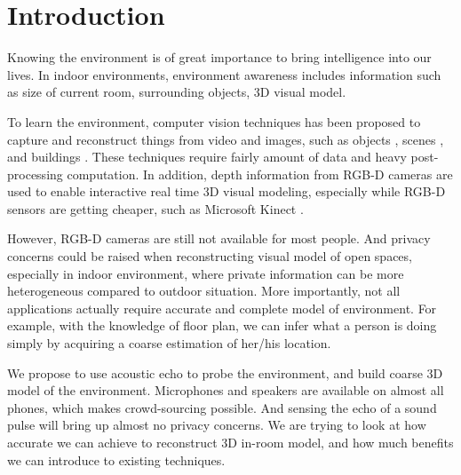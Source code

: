 \section{Introduction}
\label{sec:intro}

Knowing the environment is of great importance to bring intelligence into our lives. 
In indoor environments, environment awareness includes information such as size of 
current room, surrounding objects, 3D visual model. 


To learn the environment, computer vision techniques has been proposed to capture 
and reconstruct things from video and images, such as objects 
\cite{rothganger20063d}, scenes \cite{snavely2006photo}, and buildings 
\cite{furukawa2009reconstructing}. These techniques require fairly amount of 
data and heavy post-processing computation. In addition, depth information from 
RGB-D cameras are used to enable interactive real time 3D visual modeling, 
especially while RGB-D sensors are getting cheaper, such as Microsoft Kinect 
\cite{du2011interactive, izadi2011kinectfusion}.


However, RGB-D cameras are still not available for most people. And privacy 
concerns could be raised when reconstructing visual model of open spaces, 
especially in indoor environment, where private information can be more 
heterogeneous compared to outdoor situation. More importantly, not all 
applications actually require accurate and complete model of environment. 
For example, with the knowledge of floor plan, we can infer what a person 
is doing simply by acquiring a coarse estimation of her/his location. 


We propose to use acoustic echo to probe the environment, and build coarse 3D model 
of the environment. Microphones and speakers are available on almost all phones, 
which makes crowd-sourcing possible. And 
sensing the echo of a sound pulse will bring up almost no privacy concerns. We are 
trying to look at how accurate we can achieve to reconstruct 3D in-room model, and 
how much benefits we can introduce to existing techniques.